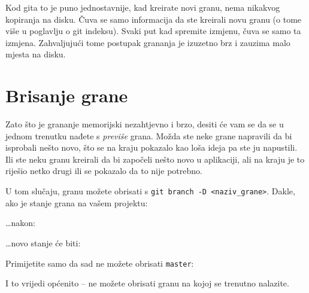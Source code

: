 Kod gita to je puno jednostavnije, kad kreirate novi granu, nema nikakvog kopiranja na disku. 
Čuva se samo informacija da ste kreirali novu granu (o tome više u poglavlju o git indeksu).
Svaki put kad spremite izmjenu, čuva se samo ta izmjena.
Zahvaljujući tome postupak grananja je izuzetno brz i zauzima malo mjesta na disku.

\section*{Brisanje grane}

Zato što je grananje memorijski nezahtjevno i brzo, desiti će vam se da se u jednom trenutku nađete s \emph{previše} grana.
Možda ste neke grane napravili da bi isprobali nešto novo, što se na kraju pokazalo kao loša ideja pa ste ju napustili.
Ili ste neku granu kreirali da bi započeli nešto novo u aplikaciji, ali na kraju je to riješio netko drugi ili se pokazalo da to nije potrebno.

U tom slučaju, granu možete obrisati s \verb+git branch -D <naziv_grane>+. 
Dakle, ako je stanje grana na vašem projektu:



\dots{}nakon:



\dots{}novo stanje će biti:



Primijetite samo da sad ne možete obrisati \verb+master+:



I to vrijedi općenito -- ne možete obrisati granu na kojoj se trenutno nalazite.



